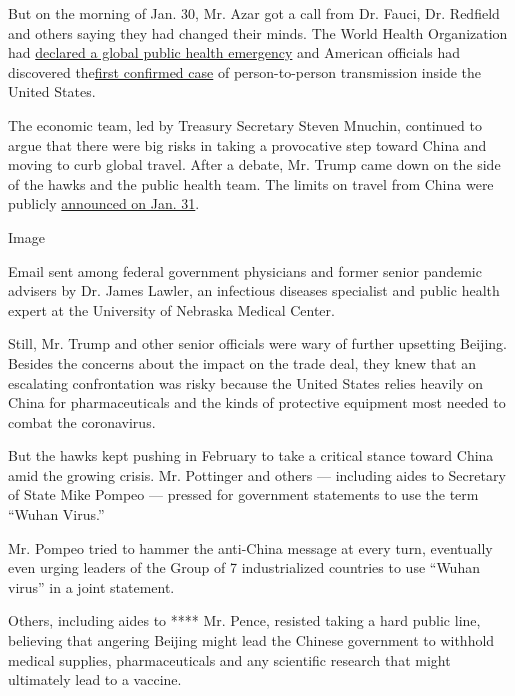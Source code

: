 But on the morning of Jan. 30, Mr. Azar got a call from Dr. Fauci, Dr.
Redfield and others saying they had changed their minds. The World
Health Organization had
\href{https://www.who.int/news-room/detail/30-01-2020-statement-on-the-second-meeting-of-the-international-health-regulations-(2005)-emergency-committee-regarding-the-outbreak-of-novel-coronavirus-(2019-ncov)}{declared
a global public health emergency} and American officials had discovered
the\href{https://www.cdc.gov/media/releases/2020/p0130-coronavirus-spread.html}{first
confirmed case} of person-to-person transmission inside the United
States.

The economic team, led by Treasury Secretary Steven Mnuchin, continued
to argue that there were big risks in taking a provocative step toward
China and moving to curb global travel. After a debate, Mr. Trump came
down on the side of the hawks and the public health team. The limits on
travel from China were publicly
\href{https://www.whitehouse.gov/presidential-actions/proclamation-suspension-entry-immigrants-nonimmigrants-persons-pose-risk-transmitting-2019-novel-coronavirus/}{announced
on Jan. 31}.

Image

Email sent among federal government physicians and former senior
pandemic advisers by Dr. James Lawler, an infectious diseases specialist
and public health expert at the University of Nebraska Medical Center.

Still, Mr. Trump and other senior officials were wary of further
upsetting Beijing. Besides the concerns about the impact on the trade
deal, they knew that an escalating confrontation was risky because the
United States relies heavily on China for pharmaceuticals and the kinds
of protective equipment most needed to combat the coronavirus.

But the hawks kept pushing in February to take a critical stance toward
China amid the growing crisis. Mr. Pottinger and others --- including
aides to Secretary of State Mike Pompeo --- pressed for government
statements to use the term ``Wuhan Virus.''

Mr. Pompeo tried to hammer the anti-China message at every turn,
eventually even urging leaders of the Group of 7 industrialized
countries to use ``Wuhan virus'' in a joint statement.

Others, including aides to **** Mr. Pence, resisted taking a hard public
line, believing that angering Beijing might lead the Chinese government
to withhold medical supplies, pharmaceuticals and any scientific
research that might ultimately lead to a vaccine.

